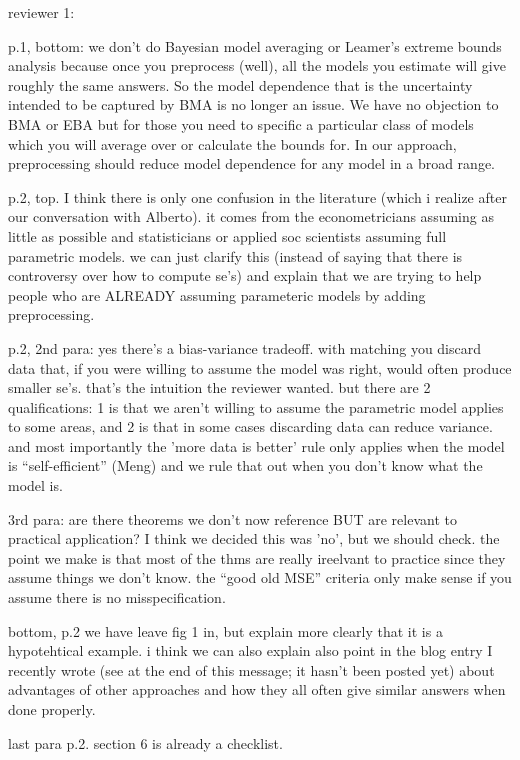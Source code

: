 reviewer 1:

p.1, bottom: we don't do Bayesian model averaging or Leamer's extreme
bounds analysis because once you preprocess (well), all the models you
estimate will give roughly the same answers.  So the model dependence
that is the uncertainty intended to be captured by BMA is no longer an
issue.  We have no objection to BMA or EBA but for those you need to
specific a particular class of models which you will average over or
calculate the bounds for.  In our approach, preprocessing should
reduce model dependence for any model in a broad range. 

p.2, top.  I think there is only one confusion in the literature
(which i realize after our conversation with Alberto). it comes from
the econometricians assuming as little as possible and statisticians
or applied soc scientists assuming full parametric models.  we can
just clarify this (instead of saying that there is controversy over
how to compute se's) and explain that we are trying to help people who
are ALREADY assuming parameteric models by adding preprocessing.

p.2, 2nd para: yes there's a bias-variance tradeoff.  with matching
you discard data that, if you were willing to assume the model was
right, would often produce smaller se's.  that's the intuition the
reviewer wanted. but there are 2 qualifications:  1 is that we aren't
willing to assume the parametric model applies to some areas, and 2 is
that in some cases discarding data can reduce variance.  and most
importantly the 'more data is better' rule only applies when the model
is ``self-efficient'' (Meng) and we rule that out when you don't know
what the model is.

3rd para: are there theorems we don't now reference BUT are relevant
to practical application?  I think we decided this was 'no', but we
should check.  the point we make is that most of the thms are really
ireelvant to practice since they assume things we don't know.  the
``good old MSE'' criteria only make sense if you assume there is no
misspecification. 

bottom, p.2 we have leave fig 1 in, but explain more clearly that it
is a hypotehtical example.  i think we can also explain also point in
the blog entry I recently wrote (see at the end of this message; it
hasn't been posted yet) about advantages of other approaches and how
they all often give similar answers when done properly.

last para p.2.  section 6 is already a checklist.

